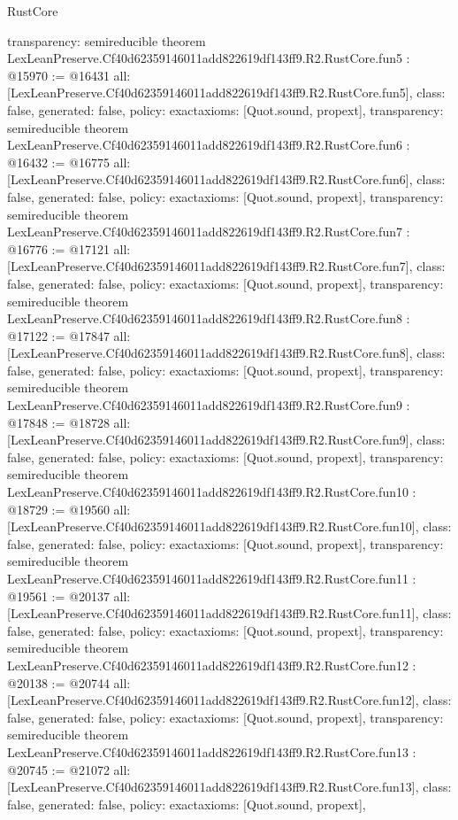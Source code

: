 \begin{lexlean}{RustCore}
\begin{coremodule}
{  transparency: semireducible
}
theorem LexLeanPreserve.Cf40d62359146011add822619df143ff9.R2.RustCore.fun5 : @15970 := @16431 {
  all: [LexLeanPreserve.Cf40d62359146011add822619df143ff9.R2.RustCore.fun5],
  class: false,
  generated: false,
  policy: exact{axioms: [Quot.sound, propext]},
  transparency: semireducible
}
theorem LexLeanPreserve.Cf40d62359146011add822619df143ff9.R2.RustCore.fun6 : @16432 := @16775 {
  all: [LexLeanPreserve.Cf40d62359146011add822619df143ff9.R2.RustCore.fun6],
  class: false,
  generated: false,
  policy: exact{axioms: [Quot.sound, propext]},
  transparency: semireducible
}
theorem LexLeanPreserve.Cf40d62359146011add822619df143ff9.R2.RustCore.fun7 : @16776 := @17121 {
  all: [LexLeanPreserve.Cf40d62359146011add822619df143ff9.R2.RustCore.fun7],
  class: false,
  generated: false,
  policy: exact{axioms: [Quot.sound, propext]},
  transparency: semireducible
}
theorem LexLeanPreserve.Cf40d62359146011add822619df143ff9.R2.RustCore.fun8 : @17122 := @17847 {
  all: [LexLeanPreserve.Cf40d62359146011add822619df143ff9.R2.RustCore.fun8],
  class: false,
  generated: false,
  policy: exact{axioms: [Quot.sound, propext]},
  transparency: semireducible
}
theorem LexLeanPreserve.Cf40d62359146011add822619df143ff9.R2.RustCore.fun9 : @17848 := @18728 {
  all: [LexLeanPreserve.Cf40d62359146011add822619df143ff9.R2.RustCore.fun9],
  class: false,
  generated: false,
  policy: exact{axioms: [Quot.sound, propext]},
  transparency: semireducible
}
theorem LexLeanPreserve.Cf40d62359146011add822619df143ff9.R2.RustCore.fun10 : @18729 := @19560 {
  all: [LexLeanPreserve.Cf40d62359146011add822619df143ff9.R2.RustCore.fun10],
  class: false,
  generated: false,
  policy: exact{axioms: [Quot.sound, propext]},
  transparency: semireducible
}
theorem LexLeanPreserve.Cf40d62359146011add822619df143ff9.R2.RustCore.fun11 : @19561 := @20137 {
  all: [LexLeanPreserve.Cf40d62359146011add822619df143ff9.R2.RustCore.fun11],
  class: false,
  generated: false,
  policy: exact{axioms: [Quot.sound, propext]},
  transparency: semireducible
}
theorem LexLeanPreserve.Cf40d62359146011add822619df143ff9.R2.RustCore.fun12 : @20138 := @20744 {
  all: [LexLeanPreserve.Cf40d62359146011add822619df143ff9.R2.RustCore.fun12],
  class: false,
  generated: false,
  policy: exact{axioms: [Quot.sound, propext]},
  transparency: semireducible
}
theorem LexLeanPreserve.Cf40d62359146011add822619df143ff9.R2.RustCore.fun13 : @20745 := @21072 {
  all: [LexLeanPreserve.Cf40d62359146011add822619df143ff9.R2.RustCore.fun13],
  class: false,
  generated: false,
  policy: exact{axioms: [Quot.sound, propext]},
}
\end{coremodule}
\end{lexlean}
